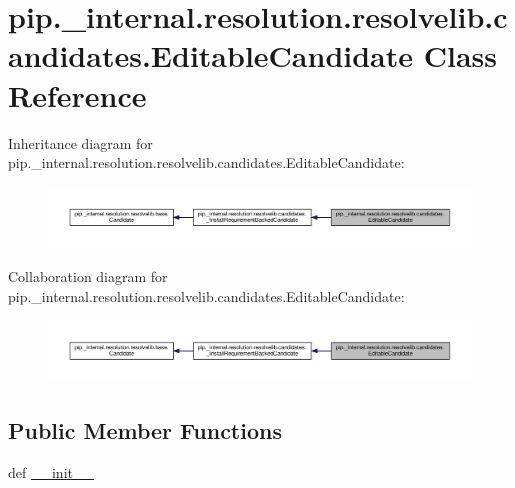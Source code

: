 \hypertarget{classpip_1_1__internal_1_1resolution_1_1resolvelib_1_1candidates_1_1EditableCandidate}{}\section{pip.\+\_\+internal.\+resolution.\+resolvelib.\+candidates.\+Editable\+Candidate Class Reference}
\label{classpip_1_1__internal_1_1resolution_1_1resolvelib_1_1candidates_1_1EditableCandidate}


Inheritance diagram for pip.\+\_\+internal.\+resolution.\+resolvelib.\+candidates.\+Editable\+Candidate\+:
\nopagebreak
\begin{figure}[H]
\begin{center}
\leavevmode
\includegraphics[width=350pt]{classpip_1_1__internal_1_1resolution_1_1resolvelib_1_1candidates_1_1EditableCandidate__inherit__graph}
\end{center}
\end{figure}


Collaboration diagram for pip.\+\_\+internal.\+resolution.\+resolvelib.\+candidates.\+Editable\+Candidate\+:
\nopagebreak
\begin{figure}[H]
\begin{center}
\leavevmode
\includegraphics[width=350pt]{classpip_1_1__internal_1_1resolution_1_1resolvelib_1_1candidates_1_1EditableCandidate__coll__graph}
\end{center}
\end{figure}
\subsection*{Public Member Functions}
\begin{DoxyCompactItemize}
\item 
def \hyperlink{classpip_1_1__internal_1_1resolution_1_1resolvelib_1_1candidates_1_1EditableCandidate_a98ffa2bdc92dc9724f75765230db0bcc}{\+\_\+\+\_\+init\+\_\+\+\_\+}
\end{DoxyCompactItemize}
